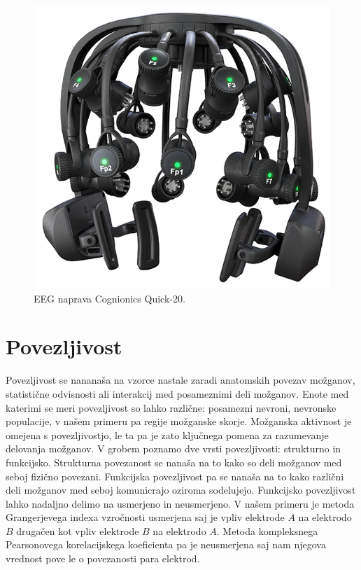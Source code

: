 \begin{figure}[h!]
    \begin{center}
    \includegraphics[width=0.5\linewidth]{slike/Cognionics Quick-20.png}
    \end{center}
    \caption{EEG naprava Cognionics Quick-20. \cite{DryEEGHeadset}}
    \end{figure}

\section{Povezljivost}
Povezljivost se nananaša na vzorce nastale zaradi anatomskih povezav možganov, statistične odvisnosti ali interakcij med posameznimi deli možganov.  Enote med katerimi se meri povezljivost so lahko različne: posamezni nevroni, nevronske populacije, v našem primeru pa regije možganske skorje. Možganska aktivnost je omejena s povezljivostjo, le ta pa je zato ključnega pomena za razumevanje delovanja možganov. V grobem poznamo dve vrsti povezljivosti: strukturno in funkcijsko. Strukturna povezanost se nanaša na to kako so deli možganov med seboj fizično povezani. Funkcijska povezljivost pa se nanaša na to kako različni deli možganov med seboj komunicrajo oziroma sodelujejo.\cite{spornsBrainConnectivity2007} Funkcijsko povezljivost lahko nadaljno delimo na usmerjeno in neusmerjeno. V našem primeru je metoda Grangerjevega indexa vzročnosti usmerjena saj je vpliv elektrode $A$ na elektrodo $B$ drugačen kot vpliv elektrode $B$ na elektrodo $A$. Metoda kompleksnega Pearsonovega korelacijskega koeficienta pa je neusmerjena saj nam njegova vrednost pove le o povezanosti para elektrod.
